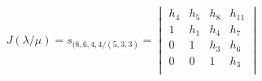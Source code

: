\documentclass[numbers=enddot,12pt,final,onecolumn,notitlepage]{scrartcl}%
\theoremstyle{definition}
\newtheorem{remk}[theo]{Remark}
\newenvironment{remark}[1][]
{\begin{remk}[#1]\begin{leftbar}}
{\end{leftbar}\end{remk}}
\newtheorem{exam}[theo]{Example}
\newenvironment{example}[1][]
{\begin{exam}[#1]\begin{leftbar}}
{\end{leftbar}\end{exam}}
\theoremstyle{plainsl}
\begin{document}
\begin{align*}
J(\lambda/\mu) = s_{(8,6,4,4/ (5,3,3)} =
\begin{vmatrix}
h_4 & h_5 & h_8 & h_{11} \\ 
1 & h_1 & h_4 & h_7  \\
0 & 1 & h_3 & h_6 \\
0 & 0 & 1 & h_3  \\ 
\end{vmatrix}\\
\end{align*}








\end{document}
